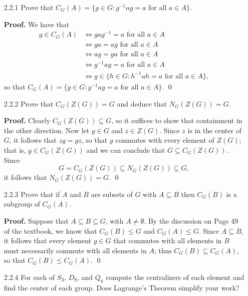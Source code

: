 \begin{enumerate}
   \item[2.2.1]   Prove that
                  $C_G(A) = \{g \in G : g^{-1}ag = a \text{ for all } a\in A\}$.

      \textbf{Proof.} We have that
      \begin{align*}
         g \in C_G(A) &\Longleftrightarrow gag^{-1}=a \text{ for all } a\in A \\
             &\Longleftrightarrow ga = ag \text{ for all } a\in A \\
             &\Longleftrightarrow ag = ga \text{ for all } a\in A \\
             &\Longleftrightarrow g^{-1}ag = a \text{ for all } a\in A \\
             &\Longleftrightarrow g \in \{h \in G : h^{-1}ah = a
              \text{ for all } a\in A\},
      \end{align*}
      so that $C_G(A) = \{g \in G : g^{-1}ag = a\text{ for all } a\in A\}$. \qed
   \item[2.2.2]   Prove that $C_G(Z(G)) = G$ and deduce that $N_G(Z(G)) = G$.

      \textbf{Proof.} Clearly $C_G(Z(G)) \subseteq G$, so it suffices to show
      that containment in the other direction. Now let $g \in G$ and
      $z \in Z(G)$. Since $z$ is in the center of $G$, it follows that
      $zg = gz$, so that $g$ commutes with every element of $Z(G)$; that is,
      $g \in C_G(Z(G))$ and we can conclude that $G \subseteq C_G(Z(G))$. Since
      $$G = C_G(Z(G)) \subseteq N_G(Z(G)) \subseteq G,$$
      it follows that $N_G(Z(G)) = G$. \qed
   \item[2.2.3]   Prove that if $A$ and $B$ are subsets of $G$ with
                  $A \subseteq B$ then $C_G(B)$ is a subgroup of $C_G(A)$.

      \textbf{Proof.} Suppose that $A \subseteq B \subseteq G$, with
      $A \neq \emptyset$. By the discussion on Page 49 of the textbook, we know
      that $C_G(B) \le G$ and $C_G(A) \le G$. Since $A \subseteq B$, it follows
      that every element $g \in G$ that commutes with all elements in $B$ must
      necessarily commute with all elements in $A$; thus
      $C_G(B) \subseteq C_G(A)$, so that $C_G(B) \le C_G(A)$. \qed
   \item[2.2.4]   For each of $S_3$, $D_8$, and $Q_8$ compute the centralizers
                  of each element and find the center of each group. Does
                  Lagrange's Theorem simplify your work?


\end{enumerate}
